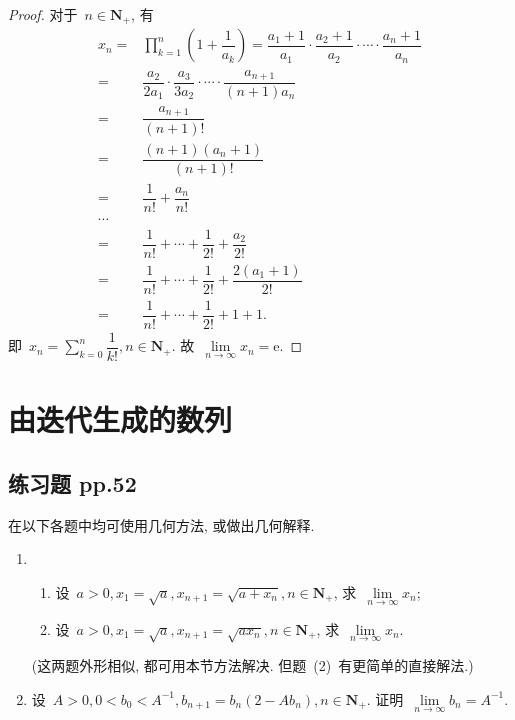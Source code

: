 \documentclass[UTF8,a4paper,10pt,twoside]{book}
\newcommand{\e}{\mathrm e}
\begin{document}
\begin{enumerate}
	      \begin{proof}
		      对于~$n\in\mathbf{N}_{+}$, 有
		      \[
			      \begin{split}
				      x_n=& \prod_{k=1}^n \left(1+\dfrac{1}{a_k}\right)=\dfrac{a_1+1}{a_1}\cdot\dfrac{a_2+1}{a_2}\cdot\cdots\cdot\dfrac{a_n+1}{a_n}\\
				      =&\dfrac{a_2}{2a_1}\cdot\dfrac{a_3}{3a_2}\cdot\cdots\cdot\dfrac{a_{n+1}}{(n+1)a_n}\\
				      =&\dfrac{a_{n+1}}{(n+1)!}\\
				      =&\dfrac{(n+1)(a_n+1)}{(n+1)!}\\
				      =&\dfrac{1}{n!}+\dfrac{a_n}{n!}\\
				      \cdots&\\
				      =&\dfrac{1}{n!}+\cdots+\dfrac{1}{2!}+\dfrac{a_2}{2!}\\
				      =&\dfrac{1}{n!}+\cdots+\dfrac{1}{2!}+\dfrac{2(a_1+1)}{2!}\\
				      =&\dfrac{1}{n!}+\cdots+\dfrac{1}{2!}+1+1.
			      \end{split}
		      \]
		      即~$x_n=\sum\limits_{k=0}^{n}\dfrac{1}{k!}, n\in\mathbf{N}_{+}$. 故~$\lim\limits_{n\to\infty} x_n=\e$.\qedhere
	      \end{proof}
\end{enumerate}

\section{由迭代生成的数列}
\subsection{练习题 pp.52}
在以下各题中均可使用几何方法, 或做出几何解释.
\begin{enumerate}
	\item
	      \begin{enumerate}[(1)]
		      \item 设~$a>0, x_1=\sqrt{a}, x_{n+1}=\sqrt{a+x_n}, n\in\mathbf{N}_{+}$, 求~$\lim\limits_{n\to\infty} x_n$;
		      \item 设~$a>0, x_1=\sqrt{a}, x_{n+1}=\sqrt{ax_n}, n\in\mathbf{N}_{+}$, 求~$\lim\limits_{n\to\infty} x_n$.
	      \end{enumerate}
	      (这两题外形相似, 都可用本节方法解决. 但题~(2)~有更简单的直接解法.)

	\item 设~$A>0, 0<b_0<A^{-1}, b_{n+1}=b_n(2-Ab_n),n\in\mathbf{N}_{+}$. 证明~$\lim\limits_{n\to\infty} b_n=A^{-1}$.
\end{enumerate}
\end{document}
